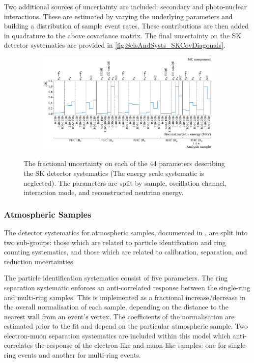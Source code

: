 Two additional sources of uncertainty are included: secondary and photo-nuclear interactions. These are estimated by varying the underlying parameters and building a distribution of sample event rates. These contributions are then added in quadrature to the above covariance matrix. The final uncertainty on the SK detector systematics are provided in \autoref{fig:SelsAndSysts_SKCovDiagonals}. 

\begin{figure}[h]
  \begin{subfigure}[t]{0.9\textwidth}
    \includegraphics[width=\textwidth, trim={0mm 0mm 0mm 0mm}, clip,page=1]{Figures/Selections/SK_Error_2020_Erec.pdf}
  \end{subfigure}
  \caption{The fractional uncertainty on each of the 44 parameters describing the SK detector systematics (The energy scale systematic is neglected). The parameters are split by sample, oscillation channel, interaction mode, and reconstructed neutrino energy.}
  \label{fig:SelsAndSysts_SKCovDiagonals}
\end{figure}

\subsubsection{Atmospheric Samples}
\label{sec:SelsAndSysts_Systs_FDAtm}

The detector systematics for atmospheric samples, documented in \cite{Jiang2019-iw}, are split into two sub-groups: those which are related to particle identification and ring counting systematics, and those which are related to calibration, separation, and reduction uncertainties.

The particle identification systematics consist of five parameters. The ring separation systematic enforces an anti-correlated response between the single-ring and multi-ring samples. This is implemented as a fractional increase/decrease in the overall normalisation of each sample, depending on the distance to the nearest wall from an event's vertex. The coefficients of the normalisation are estimated prior to the fit and depend on the particular atmospheric sample. Two electron-muon separation systematics are included within this model which anti-correlates the response of the electron-like and muon-like samples: one for single-ring events and another for multi-ring events.

